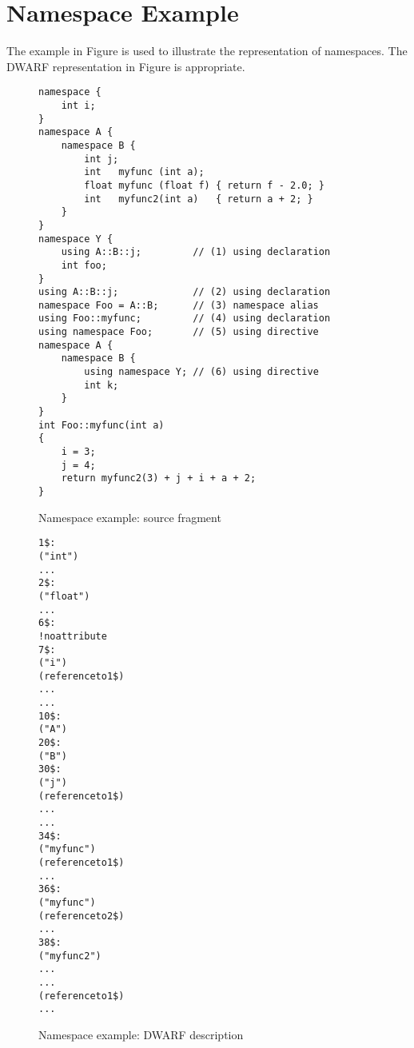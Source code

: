 \clearpage
\section{Namespace Example}
\label{app:namespaceexample}

The  example in 
Figure 
is used 
to illustrate the representation of namespaces.
The DWARF representation in 
Figure 
is appropriate.

\begin{figure}[h]
\begin{lstlisting}
namespace {
    int i;
}
namespace A {
    namespace B {
        int j;
        int   myfunc (int a);
        float myfunc (float f) { return f - 2.0; }
        int   myfunc2(int a)   { return a + 2; }
    }
}
namespace Y {
    using A::B::j;         // (1) using declaration
    int foo;
}
using A::B::j;             // (2) using declaration
namespace Foo = A::B;      // (3) namespace alias
using Foo::myfunc;         // (4) using declaration
using namespace Foo;       // (5) using directive
namespace A {
    namespace B {
        using namespace Y; // (6) using directive
        int k;
    }
}
int Foo::myfunc(int a)
{
    i = 3;
    j = 4;
    return myfunc2(3) + j + i + a + 2;
}
\end{lstlisting}
\caption{Namespace example: source fragment}
\label{fig:namespaceexamplesourcefragment}
\end{figure}


\begin{figure}[p]
\begin{dwflisting}
\begin{alltt}

1\$:  \DWTAGbasetype
        \DWATname("int")
        ...
2\$:  \DWTAGbasetype
        \DWATname("float")
        ...
6\$:  \DWTAGnamespace
        ! no \DWATname attribute
7\$:
        \DWTAGvariable
            \DWATname("i")
            \DWATtype(reference to 1\$)
            \DWATlocation ...
            ...
10\$: \DWTAGnamespace
        \DWATname("A")
20\$:    \DWTAGnamespace
            \DWATname("B")
30\$:        \DWTAGvariable
                \DWATname("j")
                \DWATtype(reference to 1\$)
                \DWATlocation ...
                ...
34\$:        \DWTAGsubprogram
                \DWATname("myfunc")
                \DWATtype(reference to 1\$)
                ...
36\$:        \DWTAGsubprogram
                \DWATname("myfunc")
                \DWATtype(reference to 2\$)
                ...
38\$:        \DWTAGsubprogram
                \DWATname("myfunc2")
                \DWATlowpc ...
                \DWAThighpc ...
                \DWATtype(reference to 1\$)
                ...
\end{alltt}
\end{dwflisting}
\caption{Namespace example: DWARF description}
\label{fig:namespaceexampledwarfdescription}
\end{figure}

